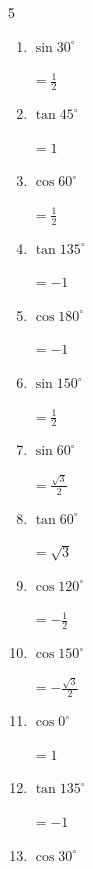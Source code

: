 \begin{multicols}{5}
\begin{enumerate}
        $\displaystyle =\frac{1}{2}$

  \item $\displaystyle \sin{30^\circ}$

        $\displaystyle =\frac{1}{2}$

  \item $\displaystyle \tan{45^\circ}$

        $\displaystyle =1$

  \item $\displaystyle \cos{60^\circ}$

        $\displaystyle =\frac{1}{2}$

  \item $\displaystyle \tan{135^\circ}$

        $\displaystyle =-1$

  \item $\displaystyle \cos{180^\circ}$

        $\displaystyle =-1$

  \item $\displaystyle \sin{150^\circ}$

        $\displaystyle =\frac{1}{2}$

\columnbreak %

  \item $\displaystyle \sin{60^\circ}$

        $\displaystyle =\frac{\sqrt{3}}{2}$

  \item $\displaystyle \tan{60^\circ}$

        $\displaystyle =\sqrt{3}$

  \item $\displaystyle \cos{120^\circ}$

        $\displaystyle =-\frac{1}{2}$

  \item $\displaystyle \cos{150^\circ}$

        $\displaystyle =-\frac{\sqrt{3}}{2}$

  \item $\displaystyle \cos{0^\circ}$

        $\displaystyle =1$

  \item $\displaystyle \tan{135^\circ}$

        $\displaystyle =-1$

  \item $\displaystyle \cos{30^\circ}$


\end{enumerate}
\end{multicols}
